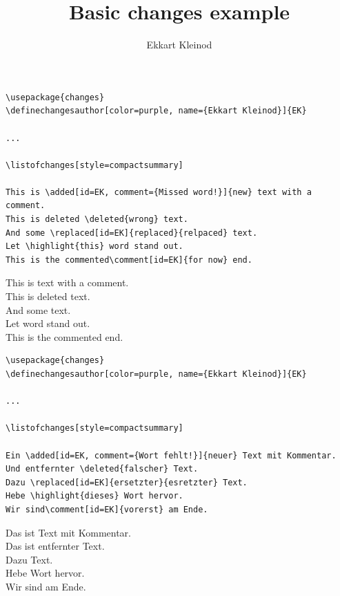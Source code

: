 \documentclass[11pt, a4paper, notitlepage, ngerman, english]{scrartcl}
\author{Ekkart Kleinod}
\title{Basic changes example}
\begin{document}
\begin{lstlisting}
\usepackage{changes}
\definechangesauthor[color=purple, name={Ekkart Kleinod}]{EK}

...

\listofchanges[style=compactsummary]

This is \added[id=EK, comment={Missed word!}]{new} text with a comment.
This is deleted \deleted{wrong} text.
And some \replaced[id=EK]{replaced}{relpaced} text.
Let \highlight{this} word stand out.
This is the commented\comment[id=EK]{for now} end.
\end{lstlisting}

\listofchanges[style=compactsummary]

\noindent
This is  text with a comment.\\
This is deleted  text.\\
And some  text.\\
Let  word stand out.\\
This is the commented end.

\clearpage
{}

\begin{lstlisting}
\usepackage{changes}
\definechangesauthor[color=purple, name={Ekkart Kleinod}]{EK}

...

\listofchanges[style=compactsummary]

Ein \added[id=EK, comment={Wort fehlt!}]{neuer} Text mit Kommentar.
Und entfernter \deleted{falscher} Text.
Dazu \replaced[id=EK]{ersetzter}{esretzter} Text.
Hebe \highlight{dieses} Wort hervor.
Wir sind\comment[id=EK]{vorerst} am Ende.
\end{lstlisting}

\listofchanges[style=compactsummary]

Das ist  Text mit Kommentar.\\
Das ist entfernter  Text.\\
Dazu  Text.\\
Hebe  Wort hervor.\\
Wir sind am Ende.
\end{document}
